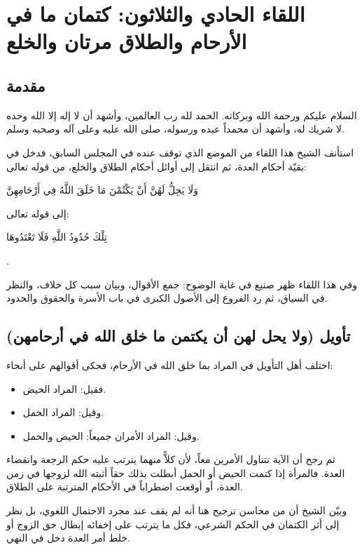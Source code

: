 \chapter{اللقاء الحادي والثلاثون: كتمان ما في الأرحام والطلاق مرتان والخلع}

\section{مقدمة}
السلام عليكم ورحمة الله وبركاته. الحمد لله رب العالمين، وأشهد أن لا إله إلا الله وحده لا شريك له، وأشهد أن محمداً عبده ورسوله، صلى الله عليه وعلى آله وصحبه وسلم.

استأنف الشيخ هذا اللقاء من الموضع الذي توقف عنده في المجلس السابق، فدخل في بقيّة أحكام العدة، ثم انتقل إلى أوائل أحكام الطلاق والخلع، من قوله تعالى: \begin{ayah}وَلَا يَحِلُّ لَهُنَّ أَنْ يَكْتُمْنَ مَا خَلَقَ اللَّهُ فِي أَرْحَامِهِنَّ\end{ayah} إلى قوله تعالى: \begin{ayah}تِلْكَ حُدُودُ اللَّهِ فَلَا تَعْتَدُوهَا\end{ayah}.

وفي هذا اللقاء ظهر صنيع  في غاية الوضوح: جمع الأقوال، وبيان سبب كل خلاف، والنظر في السياق، ثم رد الفروع إلى الأصول الكبرى في باب الأسرة والحقوق والحدود.

\separator

\section{تأويل (ولا يحل لهن أن يكتمن ما خلق الله في أرحامهن)}
 اختلف أهل التأويل في المراد بما خلق الله في الأرحام، فحكى  أقوالهم على أنحاء:
\begin{itemize}
    \item فقيل: المراد الحيض.
    \item وقيل: المراد الحمل.
    \item وقيل: المراد الأمران جميعاً: الحيض والحمل.
\end{itemize}

ثم رجح أن الآية تتناول الأمرين معاً، لأن كلاًّ منهما يترتب عليه حكم الرجعة وانقضاء العدة. فالمرأة إذا كتمت الحيض أو الحمل أبطلت بذلك حقاً أثبته الله لزوجها في زمن العدة، أو أوقعت اضطراباً في الأحكام المترتبة على الطلاق.

وبيّن الشيخ أن من محاسن ترجيح  هنا أنه لم يقف عند مجرد الاحتمال اللغوي، بل نظر إلى أثر الكتمان في الحكم الشرعي، فكل ما يترتب على إخفائه إبطال حق الزوج أو خلط أمر العدة دخل في النهي.

